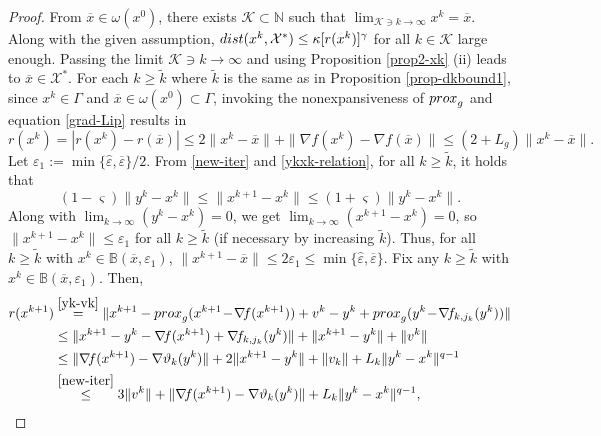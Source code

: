 \documentclass[10pt,a4paper]{amsart}
\begin{document}
\begin{proof}
 From $\overline{x}\in\omega(x^0)$, there exists $\mathcal{K}\subset\mathbb{N}$ such that $\lim_{\mathcal{K}\ni k\to\infty}x^k=\overline{x}$. Along with the given assumption, ${\rm dist}(x^k,\mathcal{X}^*)\le\kappa[r(x^k)]^{\gamma}$ for all $k\in\mathcal{K}$ large enough. Passing the limit $\mathcal{K}\ni k\to\infty$ and using Proposition \ref{prop2-xk} (ii) leads to $\overline{x}\in\mathcal{X}^*$. 
 For each $k\ge\widetilde{k}$ where $\widetilde{k}$ is the same as in Proposition \ref{prop-dkbound1}, since $x^k\!\in\Gamma$ and $\overline{x}\in\omega(x^0)\!\subset\Gamma$, invoking the nonexpansiveness of ${\rm prox}_g$ and equation \eqref{grad-Lip} results in 
 \begin{equation}\label{rxk-ineq41}
  r(x^k)=|r(x^k)-r(\overline{x})|\le 2\|x^k-\overline{x}\|+\|\nabla\!f(x^k)-\nabla\!f(\overline{x})\|\le (2\!+\!L_g)\|x^k\!-\!\overline{x}\|.
 \end{equation} 
 Let $\varepsilon_1\!:=\min\{\widehat{\varepsilon},\overline{\varepsilon}\}/2$. From \eqref{new-iter} and \eqref{ykxk-relation}, for all $k\ge \widetilde{k}$, it holds that 
 \begin{equation}\label{xkp1-ineq41}
 (1\!-\!\varsigma)\|y^k\!-\!x^k\|\le\|x^{k+1}\!-\!x^k\|\le(1\!+\!\varsigma)\|y^k\!-\!x^k\|.
 \end{equation}
 Along with $\lim_{k\to\infty}(y^k\!-\!x^k)=0$, we get $\lim_{k\to\infty}(x^{k+1}\!-\!x^k)=0$, so $\|x^{k+1}\!-\!x^k\|\le\varepsilon_1$ for all $k\ge\widetilde{k}$ (if necessary by increasing $\widetilde{k}$). Thus, for all $k\ge \widetilde{k}$ with $x^k\in\mathbb{B}(\overline{x},\varepsilon_1)$, $\|x^{k+1}-\overline{x}\|\le2\varepsilon_1\le\min\{\widehat{\varepsilon},\overline{\varepsilon}\}$. Fix any $k\ge \widetilde{k}$ with $x^k\in\mathbb{B}(\overline{x},\varepsilon_1)$. Then,
 \begin{align}\label{ineq0-rk}
  r(x^{k+1})
  &\stackrel{ \eqref{yk-vk}}{=}\|x^{k+1}-{\rm prox}_g(x^{k+1}\!-\!\nabla\!f(x^{k+1}))+v^k-y^k+{\rm prox}_g(y^k\!-\!\nabla\!f_{k,j_k}(y^k))\|\nonumber\\
  &\le \|x^{k+1}-y^k-\nabla\!f(x^{k+1})+\nabla\!f_{k,j_k}(y^k)\|+\|x^{k+1}-y^k\|+\|v^k\|\nonumber\\
  &\le \|\nabla\!f(x^{k+1})-\nabla\vartheta_{k}(y^k)\|+2\|x^{k+1}-y^k\|+\|v_k\|+L_k\|y^k-x^k\|^{q-1}\nonumber\\
  &\stackrel{ \eqref{new-iter}}{\le}3\|v^k\|+\|\nabla\!f(x^{k+1})-\nabla\vartheta_{k}(y^k)\|+L_k\|y^k-x^k\|^{q-1},
  \end{align}

\end{proof}
\end{document}
